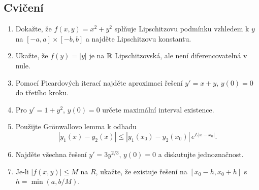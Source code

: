 \spc

\subsection*{Cvičení}
\begin{enumerate}
\item Dokažte, že $f(x,y)=x^2+y^2$ splňuje Lipschitzovu podmínku vzhledem k $y$ na $[-a,a]\times[-b,b]$ a najděte Lipschitzovu konstantu.
\item Ukažte, že $f(y)=|y|$ je na $\mathbb{R}$ Lipschitzovská, ale není diferencovatelná v nule.
\item Pomocí Picardových iterací najděte aproximaci řešení $y'=x+y$, $y(0)=0$ do třetího kroku.
\item Pro $y'=1+y^2$, $y(0)=0$ určete maximální interval existence.
\item Použijte Gr\"onwallovo lemma k odhadu
\[
|y_1(x)-y_2(x)| \le |y_1(x_0)-y_2(x_0)|\, e^{L|x-x_0|}.
\]
\item Najděte všechna řešení $y'=3y^{2/3}$, $y(0)=0$ a diskutujte jednoznačnost.
\item Je-li $|f(x,y)|\le M$ na $R$, ukažte, že existuje řešení na $[x_0-h,x_0+h]$ s $h=\min(a,b/M)$.
\end{enumerate}
